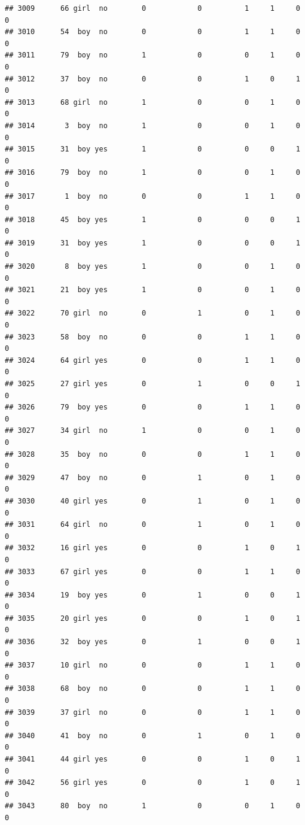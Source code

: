 \documentclass[man]{apa6}
\begin{document}
\begin{verbatim}
## 3009      66 girl  no        0            0          1     1     0     0
## 3010      54  boy  no        0            0          1     1     0     0
## 3011      79  boy  no        1            0          0     1     0     0
## 3012      37  boy  no        0            0          1     0     1     0
## 3013      68 girl  no        1            0          0     1     0     0
## 3014       3  boy  no        1            0          0     1     0     0
## 3015      31  boy yes        1            0          0     0     1     0
## 3016      79  boy  no        1            0          0     1     0     0
## 3017       1  boy  no        0            0          1     1     0     0
## 3018      45  boy yes        1            0          0     0     1     0
## 3019      31  boy yes        1            0          0     0     1     0
## 3020       8  boy yes        1            0          0     1     0     0
## 3021      21  boy yes        1            0          0     1     0     0
## 3022      70 girl  no        0            1          0     1     0     0
## 3023      58  boy  no        0            0          1     1     0     0
## 3024      64 girl yes        0            0          1     1     0     0
## 3025      27 girl yes        0            1          0     0     1     0
## 3026      79  boy yes        0            0          1     1     0     0
## 3027      34 girl  no        1            0          0     1     0     0
## 3028      35  boy  no        0            0          1     1     0     0
## 3029      47  boy  no        0            1          0     1     0     0
## 3030      40 girl yes        0            1          0     1     0     0
## 3031      64 girl  no        0            1          0     1     0     0
## 3032      16 girl yes        0            0          1     0     1     0
## 3033      67 girl yes        0            0          1     1     0     0
## 3034      19  boy yes        0            1          0     0     1     0
## 3035      20 girl yes        0            0          1     0     1     0
## 3036      32  boy yes        0            1          0     0     1     0
## 3037      10 girl  no        0            0          1     1     0     0
## 3038      68  boy  no        0            0          1     1     0     0
## 3039      37 girl  no        0            0          1     1     0     0
## 3040      41  boy  no        0            1          0     1     0     0
## 3041      44 girl yes        0            0          1     0     1     0
## 3042      56 girl yes        0            0          1     0     1     0
## 3043      80  boy  no        1            0          0     1     0     0

\end{verbatim}
\end{document}
